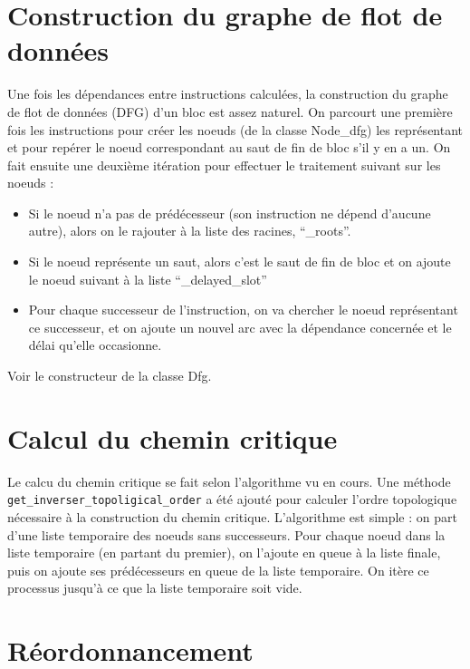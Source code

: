 \documentclass[a4paper, 11pt]{article}
\begin{document}
\section{Construction du graphe de flot de données}

Une fois les dépendances entre instructions calculées, la construction du graphe de flot de données (DFG) d'un bloc est assez naturel. On parcourt une première fois les instructions pour créer les noeuds (de la classe Node\_dfg) les représentant et pour repérer le noeud correspondant au saut de fin de bloc s'il y en a un. On fait ensuite une deuxième itération pour effectuer le traitement suivant sur les noeuds :
\begin{itemize}
\item Si le noeud n'a pas de prédécesseur (son instruction ne dépend d'aucune autre), alors on le rajouter à la liste des racines, ``\_roots''.
\item Si le noeud représente un saut, alors c'est le saut de fin de bloc et on ajoute le noeud suivant à la liste ``\_delayed\_slot''
\item Pour chaque successeur de l'instruction, on va chercher le noeud représentant ce successeur, et on ajoute un nouvel arc avec la dépendance concernée et le délai qu'elle occasionne.
\end{itemize}

Voir le constructeur de la classe Dfg.

\section{Calcul du chemin critique}

Le calcu du chemin critique se fait selon l'algorithme vu en cours. Une
méthode \verb|get_inverser_topoligical_order| a été ajouté pour calculer
l'ordre topologique nécessaire à la construction du chemin
critique. L'algorithme est simple : on part d'une liste temporaire des noeuds sans
successeurs. Pour chaque noeud dans la liste temporaire (en partant du premier), on
l'ajoute en queue à la liste finale, puis on ajoute ses prédécesseurs en queue
de la liste temporaire. On itère ce processus jusqu'à ce que la liste
temporaire soit vide.

\section{Réordonnancement}
\end{document}
